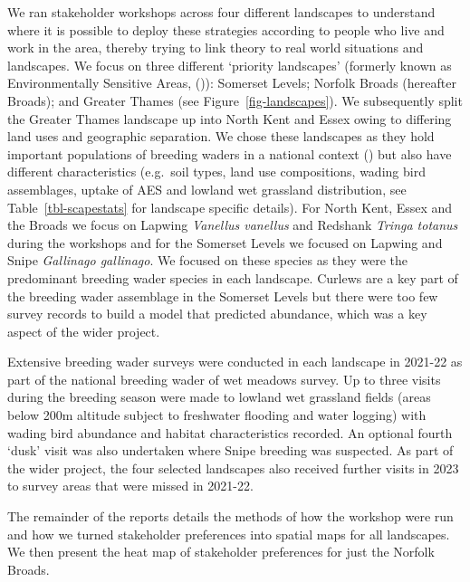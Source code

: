 \documentclass[
  12pt,
  letterpaper,
  DIV=11,
  numbers=noendperiod]{scrartcl}
\begin{document}
We ran stakeholder workshops across four different landscapes to
understand where it is possible to deploy these strategies according to
people who live and work in the area, thereby trying to link theory to
real world situations and landscapes. We focus on three different
`priority landscapes' (formerly known as Environmentally Sensitive
Areas, ()): Somerset
Levels; Norfolk Broads (hereafter Broads); and Greater Thames (see
Figure~\ref{fig-landscapes}). We subsequently split the Greater Thames
landscape up into North Kent and Essex owing to differing land uses and
geographic separation. We chose these landscapes as they hold important
populations of breeding waders in a national context
() but also have different
characteristics (e.g.~soil types, land use compositions, wading bird
assemblages, uptake of AES and lowland wet grassland distribution, see
Table~\ref{tbl-scapestats} for landscape specific details). For North
Kent, Essex and the Broads we focus on Lapwing \emph{Vanellus vanellus}
and Redshank \emph{Tringa totanus} during the workshops and for the
Somerset Levels we focused on Lapwing and Snipe \emph{Gallinago
gallinago}. We focused on these species as they were the predominant
breeding wader species in each landscape. Curlews are a key part of the
breeding wader assemblage in the Somerset Levels but there were too few
survey records to build a model that predicted abundance, which was a
key aspect of the wider project.

Extensive breeding wader surveys were conducted in each landscape in
2021-22 as part of the national breeding wader of wet meadows survey. Up
to three visits during the breeding season were made to lowland wet
grassland fields (areas below 200m altitude subject to freshwater
flooding and water logging) with wading bird abundance and habitat
characteristics recorded. An optional fourth `dusk' visit was also
undertaken where Snipe breeding was suspected. As part of the wider
project, the four selected landscapes also received further visits in
2023 to survey areas that were missed in 2021-22.

The remainder of the reports details the methods of how the workshop
were run and how we turned stakeholder preferences into spatial maps for
all landscapes. We then present the heat map of stakeholder preferences
for just the Norfolk Broads.
\end{document}

